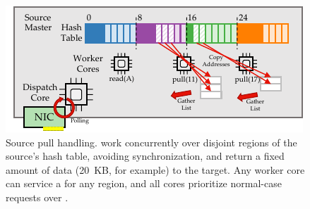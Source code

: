 \begin{figure}[t]
\centering
\includegraphics[width=0.9\columnwidth]{figures/rocksteady-source.pdf}
\caption{Source pull handling. \pulls work concurrently over disjoint
  regions of the source's hash table, avoiding synchronization, and
  return a fixed amount of data (20~KB, for example) to the target. Any
  worker core can service a \pull for any region, and all cores
  prioritize normal-case requests over \pulls.}%
\label{fig:rsource}%
\end{figure}
